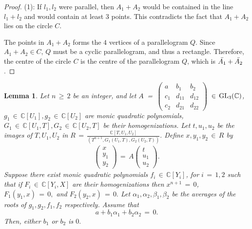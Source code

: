 \documentclass[12pt,reqno]{amsart}
\newtheorem{lemma}{Lemma}[section]
\theoremstyle{definition}
\numberwithin{equation}{section}
\begin{document}
\begin{proof}
{(1):} If $l_1, l_2$ were parallel, then $A_1 +A_2$ would be contained in the line $l_1+l_2$ and would contain at least $3$ points. This contradicts the fact that $A_1 +A_2$ lies on the circle $C$. 


 The points in $A_1 +A_2$ forms the $4$ vertices of a parallelogram $Q$. Since $A_1 +A_2\in C$, $Q$ must be a cyclic parallelogram, and thus a rectangle. Therefore, the centre of the circle $C$ is the centre of the parallelogram $Q$, which is $\Bar{A_1}+ \Bar{A_2}$.
\end{proof}
\begin{lemma}\label{alg}
Let $n\,\geq\, 2$ be an integer, and let $A$ \,=\,  $ \begin{pmatrix}
    a & b_{1} & b_{2} \\
    c_{1} & d_{11} & d_{12}\\
    c_{2} & d_{21} & d_{22}
\end{pmatrix}$ 
$\,\in\, \textnormal{GL}_{3}(\mathbb{C})$, $g_{1}\,\in\, \mathbb{C}[U_{1}], g_{2}\,\in\, \mathbb{C}[U_{2}]$ are monic quadratic polynomials, $G_{1} \,\in\, \mathbb{C}[U_{1}, T], G_{2}\,\in\, \mathbb{C}[U_{2}, T]$ be their homogenizations. Let $t, u_{1}, u_{2}$ be the images of $T, U_{1}, U_{2}$ in $ R\,=\,\frac{\mathbb{C}[T, U_{1}, U_{2}]}{(T^{n+1}, G_{1}(U_{1}, T), G_{2}(U_{2}, T))}.$ Define $x, y_1, y_2\,\in\, R$ by \begin{gather}
\begin{pmatrix}
    x \\
    y_{1}\\
    y_{2}
\end{pmatrix}
\,=\,
A
\begin{pmatrix}
    t \\
    u_{1}\\
    u_{2}
\end{pmatrix}.
\end{gather} Suppose there exist monic quadratic polynomials $f_{i}\,\in\, \mathbb{C}[Y_{i}]$, for $i \,=\, 1, 2$ such that if $F_{i}\,\in\, \mathbb{C}[Y_{i}, X]$ are their homogenizations then $x^{n+1} \,=\, 0$, $F_{1}(y_{1}, x) \,=\, 0,$ and $ F_{2}(y_{2}, x) \,=\, 0. $ Let $ \alpha_{1},\alpha_{2},\beta_{1},\beta_{2}$ be the averages of the roots of $g_1, g_2, f_1, f_2$ respectively. Assume that 
\begin{equation*}
a+b_1\alpha_1+b_2\alpha_2\,=\,0.
\end{equation*}
Then, either $b_1$ or $b_2$ is $0.$
\end{lemma}
\end{document}
